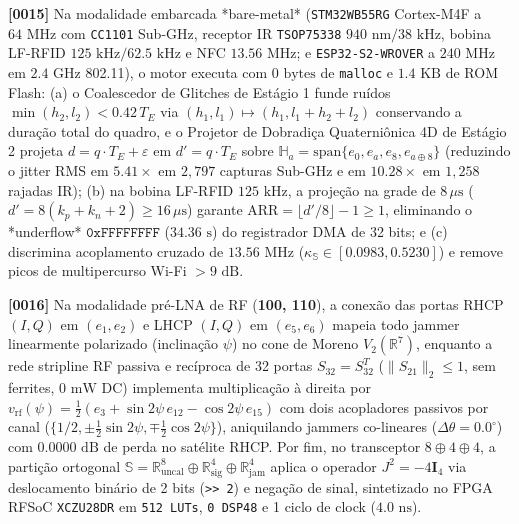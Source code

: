 \documentclass[12pt,a4paper]{article}
\begin{document}
\textbf{[0015]} Na modalidade embarcada *bare-metal* (\texttt{STM32WB55RG} Cortex-M4F a $64\text{ MHz}$ com \texttt{CC1101} Sub-GHz, receptor IR \texttt{TSOP75338} $940\text{ nm}/38\text{ kHz}$, bobina LF-RFID $125\text{ kHz}/62.5\text{ kHz}$ e NFC $13.56\text{ MHz}$; e \texttt{ESP32-S2-WROVER} a $240\text{ MHz}$ em $2.4\text{ GHz}$ 802.11), o motor executa com $0\text{ bytes}$ de \texttt{malloc} e $1.4\text{ KB}$ de ROM Flash: (a) o Coalescedor de Glitches de Est\'agio 1 funde ru\'idos $\min(h_2, l_2) < 0.42\,T_E$ via $(h_1, l_1) \mapsto (h_1, l_1 + h_2 + l_2)$ conservando a dura\c{c}\~ao total do quadro, e o Projetor de Dobradi\c{c}a Quaterni\^onica 4D de Est\'agio 2 projeta $d = q\cdot T_E + \varepsilon$ em $d' = q\cdot T_E$ sobre $\mathbb{H}_a = \mathrm{span}\{e_0, e_a, e_8, e_{a\oplus 8}\}$ (reduzindo o jitter RMS em $5.41\times$ em $2{,}797$ capturas Sub-GHz e em $10.28\times$ em $1{,}258$ rajadas IR); (b) na bobina LF-RFID $125\text{ kHz}$, a proje\c{c}\~ao na grade de $8\,\mu\text{s}$ ($d' = 8(k_p + k_n + 2) \ge 16\,\mu\text{s}$) garante $\mathrm{ARR} = \lfloor d'/8 \rfloor - 1 \ge 1$, eliminando o *underflow* $\mathtt{0xFFFFFFFF}$ ($34.36\text{ s}$) do registrador DMA de 32 bits; e (c) discrimina acoplamento cruzado de $13.56\text{ MHz}$ ($\kappa_{\mathbb{S}} \in [0.0983, 0.5230]$) e remove picos de multipercurso Wi-Fi $>9\text{ dB}$.

\textbf{[0016]} Na modalidade pr\'e-LNA de RF (\textbf{100, 110}), a conex\~ao das portas RHCP $(I,Q)$ em $(e_1,e_2)$ e LHCP $(I,Q)$ em $(e_5,e_6)$ mapeia todo jammer linearmente polarizado (inclina\c{c}\~ao $\psi$) no cone de Moreno $V_2(\mathbb{R}^7)$, enquanto a rede stripline RF passiva e rec\'iproca de 32 portas $S_{32} = S_{32}^T$ ($\|S_{21}\|_2 \le 1$, sem ferrites, $0\text{ mW}$ DC) implementa multiplica\c{c}\~ao \`a direita por $v_{\mathrm{rf}}(\psi) = \frac{1}{2}(e_3 + \sin 2\psi\,e_{12} - \cos 2\psi\,e_{15})$ com dois acopladores passivos por canal ($\{1/2, \pm\frac{1}{2}\sin 2\psi, \mp\frac{1}{2}\cos 2\psi\}$), aniquilando jammers co-lineares ($\Delta\theta = 0.0^\circ$) com $0.0000\text{ dB}$ de perda no sat\'elite RHCP. Por fim, no transceptor $8\oplus 4\oplus 4$, a parti\c{c}\~ao ortogonal $\mathbb{S} = \mathbb{R}^8_{\mathrm{uncal}} \oplus \mathbb{R}^4_{\mathrm{sig}} \oplus \mathbb{R}^4_{\mathrm{jam}}$ aplica o operador $J^2 = -4\mathbf{I}_4$ via deslocamento bin\'ario de 2 bits (\texttt{>> 2}) e nega\c{c}\~ao de sinal, sintetizado no FPGA RFSoC \texttt{XCZU28DR} em \texttt{512 LUTs}, \texttt{0 DSP48} e 1 ciclo de clock ($4.0\text{ ns}$).
\end{document}
